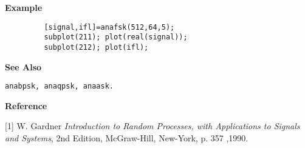 {\bf \large {}\selectfont Example}
\begin{verbatim}
         [signal,ifl]=anafsk(512,64,5); 
         subplot(211); plot(real(signal)); 
         subplot(212); plot(ifl);
\end{verbatim}
\vspace*{.5cm}


{\bf \large {}\selectfont See Also}\\
\hspace*{1.5cm}
\begin{minipage}[t]{13.5cm}
\begin{verbatim}
anabpsk, anaqpsk, anaask.
\end{verbatim}
\end{minipage}
\vspace*{.5cm}


{\bf \large {}\selectfont Reference}\\
\hspace*{1.5cm}
\begin{minipage}[t]{13.5cm}
[1] W. Gardner {\it Introduction to Random Processes, with Applications to
Signals and Systems}, 2nd Edition, McGraw-Hill, New-York, p. 357 ,1990.  
\end{minipage}
